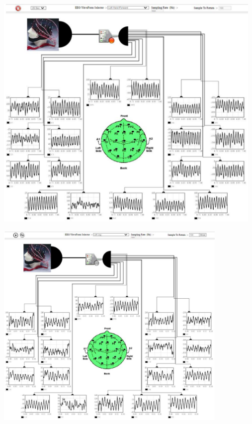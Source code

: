 \documentclass[
  11pt,
  letterpaper,
  DIV=11,
  numbers=noendperiod]{scrreprt}
\begin{document}
\begin{center}
\includegraphics[width=5.11458in,height=\textheight]{images/clipboard-2354709684.png}
\end{center}

\begin{center}
\includegraphics[width=4.41667in,height=\textheight]{images/clipboard-2400029708.png}
\end{center}
\end{document}
